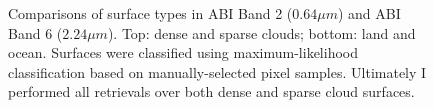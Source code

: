 \documentclass[12pt]{article}
\begin{document}
\begin{figure}[h!]
\begin{center}
{        }
    \end{center}
    \caption{Comparisons of surface types in ABI Band 2 ($0.64\mu m$) and ABI Band 6 ($2.24\mu m$). Top: dense and sparse clouds; bottom: land and ocean. Surfaces were classified using maximum-likelihood classification based on manually-selected pixel samples. Ultimately I performed all retrievals over both dense and sparse cloud surfaces.}
    \label{domain_rgbs}
\end{figure}

\clearpage

\begin{figure}[h!]
    \centering
    \begin{center}
\end{center}
\end{figure}
\end{document}
